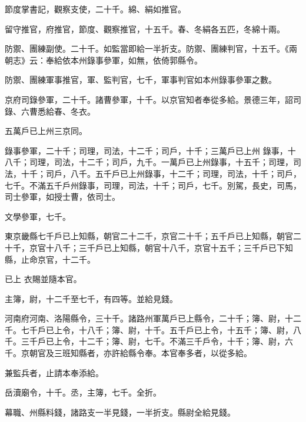 \begin{pinyinscope}
 節度掌書記，觀察支使，二十千。綿、絹如推官。



 留守推官，府推官，節度、觀察推官，十五千。春、冬絹各五匹，冬綿十兩。



 防禦、團練副使。二十千。如監當即給一半折支。防禦、團練判官，十五千。《兩朝志》云：奉給依本州錄事參軍，如無，依倚郭縣令。



 防禦、團練軍事推官，軍、監判官，七千，軍事判官如本州錄事參軍之數。



 京府司錄參軍，二十千。諸曹參軍，十千。以京官知者奉從多給。景德三年，詔司錄、六曹悉給春、冬衣。



 五萬戶已上州三京同。



 錄事參軍，二十千；司理，司法，十二千；司戶，十千；三萬戶已上州
 錄事，十八千；司理，司法，十二千；司戶，九千。一萬戶已上州錄事，十五千；司理，司法，十千；司戶，八千。五千戶已上州錄事，十二千；司理，司法，十千；司戶，七千。不滿五千戶州錄事，司理，司法，十千；司戶，七千。別駕，長史，司馬，司士參軍，如授士曹，依司士。



 文學參軍，七千。



 東京畿縣七千戶已上知縣，朝官二十二千，京官二十千；五千戶已上知縣，朝官二十千，京官十八千；三千戶已上知縣，朝官十八千，京官十五千；三千戶已下知縣，止命京官，十二千。



 已上
 衣賜並隨本官。



 主簿，尉，十二千至七千，有四等。並給見錢。



 河南府河南、洛陽縣令，三十千。諸路州軍萬戶已上縣令，二十千；簿、尉，十二千。七千戶已上令，十八千；簿、尉，十千。五千戶已上令，十五千；簿、尉，八千。三千戶已上令，十二千；簿、尉，七千。不滿三千戶令，十千；簿、尉，六千。京朝官及三班知縣者，亦許給縣令奉。本官奉多者，以從多給。



 兼監兵者，止請本奉添給。



 岳瀆廟令，十千。丞，主簿，七千。全折。



 幕職、州縣料錢，諸路支一半見錢，一半折支。縣尉全給見錢。




\end{pinyinscope}
